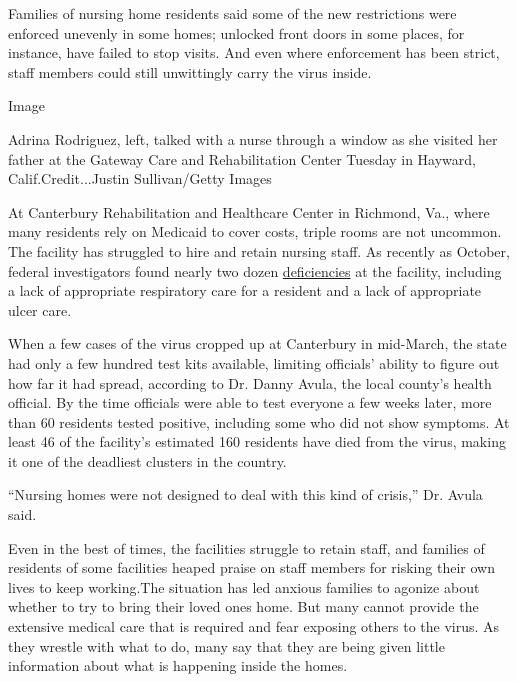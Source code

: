 Families of nursing home residents said some of the new restrictions
were enforced unevenly in some homes; unlocked front doors in some
places, for instance, have failed to stop visits. And even where
enforcement has been strict, staff members could still unwittingly carry
the virus inside.

Image

Adrina Rodriguez, left, talked with a nurse through a window as she
visited her father at the Gateway Care and Rehabilitation Center Tuesday
in Hayward, Calif.Credit...Justin Sullivan/Getty Images

At Canterbury Rehabilitation and Healthcare Center in Richmond, Va.,
where many residents rely on Medicaid to cover costs, triple rooms are
not uncommon. The facility has struggled to hire and retain nursing
staff. As recently as October, federal investigators found nearly two
dozen
\href{https://www.medicare.gov/nursinghomecompare/previousInspections.html?ID=495272\&Inspn=HEALTH\&profTab=1\&Distn=15.2\&loc=RICHMOND\%2C\%20VA\&lat=37.5407246\&lng=-77.4360481\&name=CANTERBURY\%20REHABILITATION\%20\%26\%20HEALTH\%20CARE\%20CENTER}{deficiencies}
at the facility, including a lack of appropriate respiratory care for a
resident and a lack of appropriate ulcer care.

When a few cases of the virus cropped up at Canterbury in mid-March, the
state had only a few hundred test kits available, limiting officials'
ability to figure out how far it had spread, according to Dr. Danny
Avula, the local county's health official. By the time officials were
able to test everyone a few weeks later, more than 60 residents tested
positive, including some who did not show symptoms. At least 46 of the
facility's estimated 160 residents have died from the virus, making it
one of the deadliest clusters in the country.

``Nursing homes were not designed to deal with this kind of crisis,''
Dr. Avula said.

Even in the best of times, the facilities struggle to retain staff, and
families of residents of some facilities heaped praise on staff members
for risking their own lives to keep working.The situation has led
anxious families to agonize about whether to try to bring their loved
ones home. But many cannot provide the extensive medical care that is
required and fear exposing others to the virus. As they wrestle with
what to do, many say that they are being given little information about
what is happening inside the homes.

